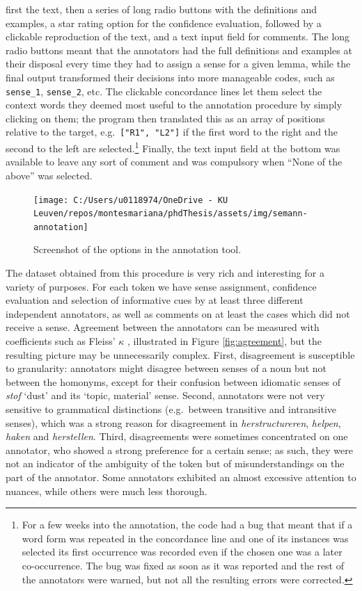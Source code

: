 \documentclass[
]{book}
\begin{document}
first the text, then a series of long radio buttons with the definitions and examples, a star rating option for the confidence evaluation, followed by a clickable reproduction of the text, and a text input field for comments. The long radio buttons meant that the annotators had the full definitions and examples at their disposal every time they had to assign a sense for a given lemma, while the final output transformed their decisions into more manageable codes, such as \texttt{sense\_1}, \texttt{sense\_2}, etc. The clickable concordance lines let them select the context words they deemed most useful to the annotation procedure by simply clicking on them; the program then translated this as an array of positions relative to the target, e.g.~\texttt{{[}"R1",\ "L2"{]}} if the first word to the right and the second to the left are selected.\footnote{For a few weeks into the annotation, the code had a bug that meant that if a word form was repeated in the concordance line and one of its instances was selected its first occurrence was recorded even if the chosen one was a later co-occurrence. The bug was fixed as soon as it was reported and the rest of the annotators were warned, but not all the resulting errors were corrected.} Finally, the text input field at the bottom was available to leave any sort of comment and was compulsory when ``None of the above'' was selected.



\begin{figure}
\texttt{[image: C:/Users/u0118974/OneDrive - KU Leuven/repos/montesmariana/phdThesis/assets/img/semann-annotation]} \caption{Screenshot of the options in the annotation tool.}\label{fig:semann}
\end{figure}

The dataset obtained from this procedure is very rich and interesting for a variety of purposes. For each token we have sense assignment, confidence evaluation and selection of informative cues by at least three different independent annotators, as well as comments on at least the cases which did not receive a sense. Agreement between the annotators can be measured with coefficients such as Fleiss' \(\kappa\) \autocite{fleiss_1971}, illustrated in Figure \ref{fig:agreement}, but the resulting picture may be unnecessarily complex. First, disagreement is susceptible to granularity: annotators might disagree between senses of a noun but not between the homonyms, except for their confusion between idiomatic senses of \emph{stof} `dust' and its `topic, material' sense. Second, annotators were not very sensitive to grammatical distinctions (e.g.~between transitive and intransitive senses), which was a strong reason for disagreement in \emph{herstructureren}, \emph{helpen}, \emph{haken} and \emph{herstellen}. Third, disagreements were sometimes concentrated on one annotator, who showed a strong preference for a certain sense; as such, they were not an indicator of the ambiguity of the token but of misunderstandings on the part of the annotator. Some annotators exhibited an almost excessive attention to nuances, while others were much less thorough.
\end{document}
